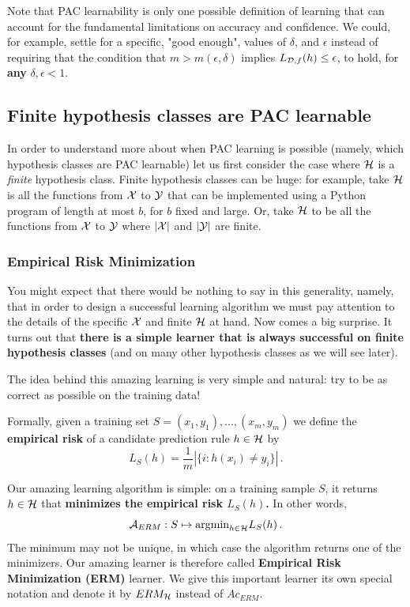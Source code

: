 {Note that  PAC learnability is only one possible definition of learning that can account for the fundamental limitations on accuracy and confidence. We could, for example, settle for a specific, "good enough", values of $\delta$,  and $\epsilon$ instead of requiring that the condition that $m > m(\epsilon, \delta)$ implies  $L_{\mathcal{D}, f}(h) \le \epsilon$, to hold, for {\bf any} $\delta, \epsilon <1$.

\subsection{Finite hypothesis classes are PAC learnable}

In order to understand more about when PAC learning is possible (namely, which hypothesis classes are PAC learnable) let us first consider the case where $\mathcal{H}$ is a \textit{finite} hypothesis class.
Finite hypothesis classes can be huge: for example, take $\mathcal{H}$ is all the functions from $\mathcal{X}$ to $\mathcal{Y}$ that can be implemented using a Python program of length at most $b$, for $b$ fixed and large. Or, take $\mathcal{H}$ to be all the functions from $\mathcal{X}$ to $\mathcal{Y}$ where  $|\mathcal{X}|$ and $|\mathcal{Y}|$ are finite.

\subsubsection{Empirical Risk Minimization}

You might expect that there would be nothing to say in this generality, namely,
that in order to design a successful learning algorithm we must pay attention to
the details of the specific $\mathcal{X}$ and finite $\mathcal{H}$ at hand.
Now comes a big surprise. It turns out that {\bf there is a simple learner that is always successful on finite hypothesis classes} (and on many other hypothesis classes as we will see later).

The idea behind this amazing learning is very simple and natural: try to be as correct as possible on the training data!

Formally, given  a training set $S = (x_1,y_1),\ldots,(x_m,y_m)$ we define the {\bf empirical risk} of a candidate prediction rule $h\in\mathcal{H}$ by
$$L_S(h) = \frac{1}{m} |\{i : h(x_i)  \neq y_i\}|\,.$$

Our amazing learning algorithm is simple: on a training sample $S$, it returns $h \in \mathcal{H}$ that {\bf minimizes the empirical risk $L_S(h)$.} In other words,
\[
\mathcal{A}_{ERM} : S \mapsto \text{argmin}_{h\in\mathcal{H}} L_S(h)\,.
\]
The minimum may not be unique, in which case the algorithm returns one of the minimizers. Our amazing learner is therefore called \textbf{Empirical Risk Minimization (ERM)} learner. We give this important learner its own special notation and denote it by $ERM_{\mathcal{H}}$ instead of $Ac_{ERM}$.

}
